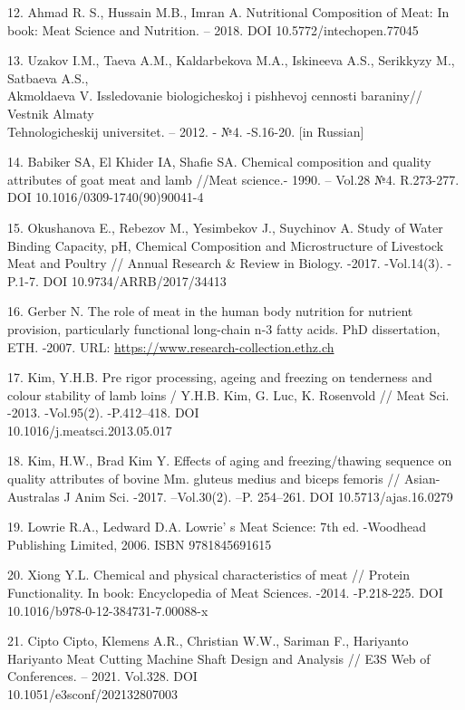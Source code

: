 \begin{references}
12. Ahmad R. S., Hussain M.B., Imran A. Nutritional Composition of Meat:
In book: Meat Science and Nutrition. -- 2018. DOI
10.5772/intechopen.77045

13. Uzakov I.M., Taeva A.M., Kaldarbekova M.A., Iskineeva A.S.,
Serikkyzy M., Satbaeva A.S., \\Akmoldaeva V. Issledovanie biologicheskoj i
pishhevoj cennosti baraniny// Vestnik Almaty \\Tehnologicheskij
universitet. -- 2012. - №4. -S.16-20. {[}in Russian{]}

14. Babiker SA, El Khider IA, Shafie SA. Chemical composition and
quality attributes of goat meat and lamb //Meat science.- 1990. --
Vol.28 №4. R.273-277. DOI 10.1016/0309-1740(90)90041-4

15. Okushanova E., Rebezov M., Yesimbekov J., Suychinov A. Study of
Water Binding Capacity, pH, Chemical Composition and Microstructure of
Livestock Meat and Poultry // Annual Research \& Review in Biology.
-2017. -Vol.14(3). -P.1-7. DOI 10.9734/ARRB/2017/34413

16. Gerber N. The role of meat in the human body nutrition for nutrient
provision, particularly functional long-chain n-3 fatty acids. PhD
dissertation, ETH. -2007. URL:
\href{https://www.research-collection.ethz.ch/bitstream/handle/20.500.11850/150127/eth-29901-02.pdf}{https://www.research-collection.ethz.ch}

17. Kim, Y.H.B. Pre rigor processing, ageing and freezing on tenderness
and colour stability of lamb loins / Y.H.B. Kim, G. Luc, K. Rosenvold //
Meat Sci. -2013. -Vol.95(2). -P.412--418. DOI\\
10.1016/j.meatsci.2013.05.017

18. Kim, H.W., Brad Kim Y. Effects of aging and freezing/thawing
sequence on quality attributes of bovine Mm. gluteus medius and biceps
femoris // Asian-Australas J Anim Sci. -2017. --Vol.30(2). --P.
254--261. DOI 10.5713/ajas.16.0279

19. Lowrie R.A., Ledward D.A. Lowrie' s Meat Science: 7th
ed. -Woodhead Publishing Limited, 2006. ISBN 9781845691615

20. Xiong Y.L. Chemical and physical characteristics of meat // Protein
Functionality. In book: Encyclopedia of Meat Sciences. -2014.
-P.218-225. DOI 10.1016/b978-0-12-384731-7.00088-x

21. Cipto Cipto, Klemens A.R., Christian W.W., Sariman F., Hariyanto
Hariyanto Meat Cutting Machine Shaft Design and Analysis // E3S Web of
Conferences. -- 2021. Vol.328. DOI \\10.1051/e3sconf/202132807003


\end{references}
